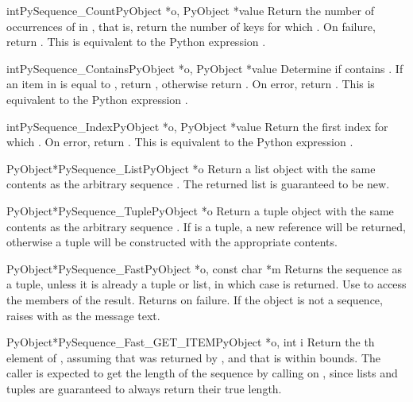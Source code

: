 \documentclass{manual}
\begin{document}
\begin{cfuncdesc}{int}{PySequence_Count}{PyObject *o, PyObject *value}
Return the number of occurrences of  in , that is,
return the number of keys for which .  On failure, return .  This is equivalent to
the Python expression .
\end{cfuncdesc}

\begin{cfuncdesc}{int}{PySequence_Contains}{PyObject *o, PyObject *value}
Determine if  contains .  If an item in  is
equal to , return , otherwise return .  On
error, return .  This is equivalent to the Python expression
.
\end{cfuncdesc}

\begin{cfuncdesc}{int}{PySequence_Index}{PyObject *o, PyObject *value}
Return the first index  for which .  On error, return .    This is equivalent to
the Python expression .
\end{cfuncdesc}

\begin{cfuncdesc}{PyObject*}{PySequence_List}{PyObject *o}
Return a list object with the same contents as the arbitrary sequence
.  The returned list is guaranteed to be new.
\end{cfuncdesc}

\begin{cfuncdesc}{PyObject*}{PySequence_Tuple}{PyObject *o}
Return a tuple object with the same contents as the arbitrary sequence
.  If  is a tuple, a new reference will be returned,
otherwise a tuple will be constructed with the appropriate contents.
\end{cfuncdesc}


\begin{cfuncdesc}{PyObject*}{PySequence_Fast}{PyObject *o, const char *m}
Returns the sequence  as a tuple, unless it is already a
tuple or list, in which case  is returned.  Use
 to access the members of the
result.  Returns \NULL{} on failure.  If the object is not a sequence,
raises  with  as the message text.
\end{cfuncdesc}

\begin{cfuncdesc}{PyObject*}{PySequence_Fast_GET_ITEM}{PyObject *o, int i}
Return the th element of , assuming that  was
returned by , and that  is within
bounds.  The caller is expected to get the length of the sequence by
calling  on , since lists and tuples
are guaranteed to always return their true length.
\end{cfuncdesc}
\end{document}
